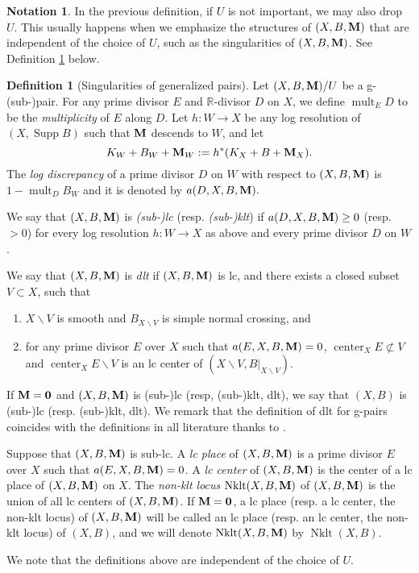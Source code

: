 \documentclass[11pt]{amsart}
\numberwithin{equation}{section}
\newcommand{\Mm}{{\bf{M}}}
\newcommand{\Center}{\operatorname{center}}
\newcommand{\Nklt}{\operatorname{Nklt}}
\newcommand{\Supp}{\operatorname{Supp}}
\newcommand{\mult}{\operatorname{mult}}
\theoremstyle{definition}
\newtheorem{defn}[thm]{Definition}
\theoremstyle{definition}
\newtheorem{nota}[thm]{Notation}
\theoremstyle{definition}
\begin{document}
\begin{nota}
In the previous definition, if $U$ is not important, we may also drop $U$. This usually happens when we emphasize the structures of $(X,B,\Mm)$ that are independent of the choice of $U$, such as the singularities of $(X,B,\Mm)$. See Definition \ref{defn: sing of g-pairs} below.
\end{nota}





\begin{defn}[Singularities of generalized pairs]\label{defn: sing of g-pairs}
	Let $(X,B,\Mm)/U$ be a g-(sub-)pair. For any prime divisor $E$ and $\mathbb R$-divisor $D$ on $X$, we define $\mult_{E}D$ to be the \emph{multiplicity} of $E$ along $D$.  Let $h:W\to X$
	be any log resolution of $(X,\Supp B)$ such that $\Mm$ descends to $W$, and let
	$$K_W+B_W+\Mm_W:=h^*(K_X+B+\Mm_X).$$
	The \emph{log discrepancy} of a prime divisor $D$ on $W$ with respect to $(X,B,\Mm)$ is $1-\mult_{D}B_W$ and it is denoted by $a(D,X,B,\Mm).$
	
	We say that $(X,B,\Mm)$ is \emph{(sub-)lc} (resp. \emph{(sub-)klt}) if $a(D,X,B,\Mm)\ge0$ (resp. $>0$) for every log resolution $h: W\to X$ as above and every prime divisor $D$ on $W$. 
	
	We say that $(X,B,\Mm)$ is \emph{dlt} if $(X,B,\Mm)$ is lc, and there exists a closed subset $V\subset X$, such that
\begin{enumerate}
    \item $X\backslash V$ is smooth and $B_{X\backslash V}$ is simple normal crossing, and
    \item for any prime divisor $E$ over $X$ such that $a(E,X,B,\Mm)=0$, $\Center_XE\not\subset V$ and $\Center_XE\backslash V$ is an lc center of $(X\backslash V,B|_{X\backslash V})$.
\end{enumerate}
If $\Mm=\bm{0}$ and $(X,B,\Mm)$ is (sub-)lc (resp, (sub-)klt, dlt), we say that $(X,B)$ is (sub-)lc (resp. (sub-)klt, dlt). We remark that the definition of dlt for g-pairs coincides with the definitions in all literature thanks to \cite[Theorem 6.1]{Has22}.
	    
	 Suppose that $(X,B,\Mm)$ is sub-lc. A \emph{lc place} of $(X,B,\Mm)$ is a prime divisor $E$ over $X$ such that $a(E,X,B,\Mm)=0$. A \emph{lc center} of $(X,B,\Mm)$ is the center of a lc place of $(X,B,\Mm)$ on $X$. The \emph{non-klt locus} $\Nklt(X,B,\Mm)$ of $(X,B,\Mm)$ is the union of all lc centers of $(X,B,\Mm)$. If $\Mm=\bm{0}$, a lc place (resp. a lc center, the non-klt locus) of $(X,B,\Mm)$ will be called an lc place (resp. an lc center, the non-klt locus) of $(X,B)$, and we will denote $\Nklt(X,B,\Mm)$ by $\Nklt(X,B)$. 
	 
	 We note that the definitions above are independent of the choice of $U$.
\end{defn}
\end{document}
